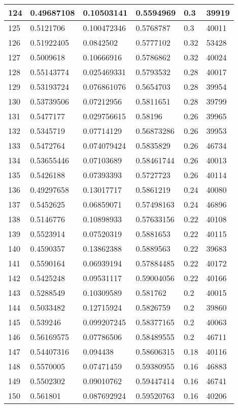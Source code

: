 \begin{longtable}{|l|l|l|l|l|l|}
124 & 0.49687108 & 0.10503141 & 0.5594969 & 0.3 & 39919 \\ \hline 
125 & 0.5121706 & 0.100472346 & 0.5768787 & 0.3 & 40011 \\ \hline 
126 & 0.51922405 & 0.0842502 & 0.5777102 & 0.32 & 53428 \\ \hline 
127 & 0.5009618 & 0.10666916 & 0.5786862 & 0.32 & 40024 \\ \hline 
128 & 0.55143774 & 0.025469331 & 0.5793532 & 0.28 & 40017 \\ \hline 
129 & 0.53193724 & 0.076861076 & 0.5654703 & 0.28 & 39954 \\ \hline 
130 & 0.53739506 & 0.07212956 & 0.5811651 & 0.28 & 39799 \\ \hline 
131 & 0.5477177 & 0.029756615 & 0.58196 & 0.26 & 39965 \\ \hline 
132 & 0.5345719 & 0.07714129 & 0.56873286 & 0.26 & 39953 \\ \hline 
133 & 0.5472764 & 0.074079424 & 0.5835829 & 0.26 & 46734 \\ \hline 
134 & 0.53655446 & 0.07103689 & 0.58461744 & 0.26 & 40013 \\ \hline 
135 & 0.5426188 & 0.07393393 & 0.5727723 & 0.26 & 40114 \\ \hline 
136 & 0.49297658 & 0.13017717 & 0.5861219 & 0.24 & 40080 \\ \hline 
137 & 0.5452625 & 0.06859071 & 0.57498163 & 0.24 & 46896 \\ \hline 
138 & 0.5146776 & 0.10898933 & 0.57633156 & 0.22 & 40108 \\ \hline 
139 & 0.5523914 & 0.07520319 & 0.5881653 & 0.22 & 40115 \\ \hline 
140 & 0.4590357 & 0.13862388 & 0.5889563 & 0.22 & 39683 \\ \hline 
141 & 0.5590164 & 0.06939194 & 0.57884485 & 0.22 & 40172 \\ \hline 
142 & 0.5425248 & 0.09531117 & 0.59004056 & 0.22 & 40166 \\ \hline 
143 & 0.5288549 & 0.10309589 & 0.581762 & 0.2 & 40015 \\ \hline 
144 & 0.5033482 & 0.12715924 & 0.5826759 & 0.2 & 39860 \\ \hline 
145 & 0.539246 & 0.099207245 & 0.58377165 & 0.2 & 40063 \\ \hline 
146 & 0.56169575 & 0.07786506 & 0.58489555 & 0.2 & 46711 \\ \hline 
147 & 0.54407316 & 0.094438 & 0.58606315 & 0.18 & 40116 \\ \hline 
148 & 0.5570005 & 0.07471459 & 0.59380955 & 0.16 & 46883 \\ \hline 
149 & 0.5502302 & 0.09010762 & 0.59447414 & 0.16 & 46741 \\ \hline 
150 & 0.561801 & 0.087692924 & 0.59520763 & 0.16 & 40206 \\ \hline 
\end{longtable}